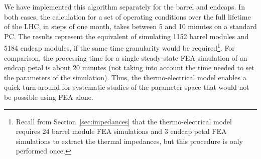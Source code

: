 We have implemented this algorithm separately for the barrel and endcaps. In both cases, the calculation for a set of operating conditions over the full lifetime of the LHC, in steps of one month, takes between 5 and 10 minutes on a standard PC. The results represent the equivalent of simulating 1152 barrel modules and 5184 endcap modules, if the same time granularity would be required\footnote{Recall from Section~\ref{sec:impedances} that the thermo-electrical model requires 24 barrel module FEA simulations and 3 endcap petal FEA simulations to extract the thermal impedances, but this procedure is only performed once.}. For comparison, the processing time for a single steady-state FEA simulation of an endcap petal is about 20 minutes (not taking into account the time needed to set the parameters of the simulation). Thus, the thermo-electrical model enables a quick turn-around for systematic studies of the parameter space that would not be possible using FEA alone.
